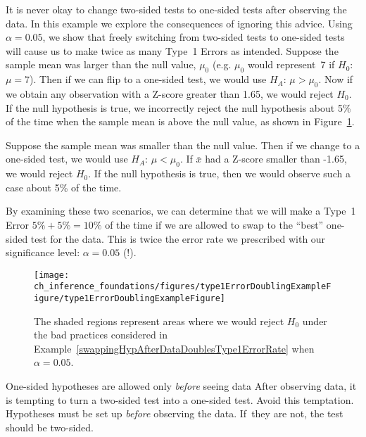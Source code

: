 \begin{example}{It is never okay to change two-sided tests to one-sided tests after observing the data. In this example we explore the consequences of ignoring this advice. Using $\alpha=0.05$, we show that freely switching from two-sided tests to one-sided tests will cause us to make twice as many Type~1 Errors as intended.} \label{swappingHypAfterDataDoublesType1ErrorRate}
Suppose the sample mean was larger than the null value, $\mu_0$ (e.g. $\mu_0$ would represent~7 if $H_0$:~$\mu = 7$). Then if we can flip to a one-sided test, we would use $H_A$: $\mu > \mu_0$. Now if we obtain any observation with a Z-score greater than 1.65, we would reject $H_0$. If the null hypothesis is true, we incorrectly reject the null hypothesis about 5\% of the time when the sample mean is above the null value, as shown in Figure~\ref{type1ErrorDoublingExampleFigure}.

Suppose the sample mean was smaller than the null value. Then if we change to a one-sided test, we would use $H_A$: $\mu < \mu_0$. If $\bar{x}$ had a Z-score smaller than -1.65, we would reject $H_0$. If the null hypothesis is true, then we would observe such a case about 5\% of the time.

By examining these two scenarios, we can determine that we will make a Type~1 Error $5\%+5\%=10\%$ of the time if we are allowed to swap to the ``best'' one-sided test for the data. This is twice the error rate we prescribed with our significance level: $\alpha=0.05$ (!).

\begin{figure}
   \centering
   \texttt{[image: ch\_inference\_foundations/figures/type1ErrorDoublingExampleFigure/type1ErrorDoublingExampleFigure]}
   \caption{The shaded regions represent areas where we would reject $H_0$ under the bad practices considered in Example~\ref{swappingHypAfterDataDoublesType1ErrorRate} when $\alpha = 0.05$.}
   \label{type1ErrorDoublingExampleFigure}
\end{figure}

\end{example}

\begin{caution}{One-sided hypotheses are allowed only \emph{before} seeing data}
{After observing data, it is tempting to turn a two-sided test into a one-sided test. Avoid this temptation. Hypotheses must be set up \emph{before} observing the data. If~they are not, the test should be two-sided.}
\end{caution}


